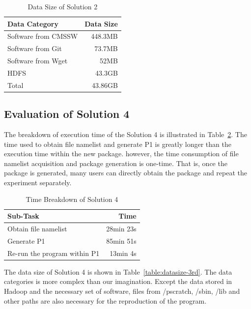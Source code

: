 \documentclass{acm_proc_article-sp}
\begin{document}
\begin{table}
    \centering
    \begin{tabular}{|l|r|}
    \hline
    Data Category & Data Size \\ \hline
    Software from CMSSW & 448.3MB \\ \hline
    Software from Git & 73.7MB \\ \hline
    Software from Wget & 52MB \\ \hline
    HDFS & 43.3GB \\ \hline
    Total & 43.86GB \\ \hline
    \end{tabular}
    \caption{Data Size of Solution 2}
    \label{table:datasize-2nd}
\end{table}

\subsection{Evaluation of Solution 4}
The breakdown of execution time of the Solution 4 is illustrated in Table~\ref{table:time-3rd}. The time used to obtain file namelist and generate P1 is greatly longer than the execution time within the new package. however, the time consumption of file namelist acquisition and package generation is one-time. That is, once the package is generated, many users can directly obtain the package and repeat the experiment separately. 

\begin{table}
    \centering
    \begin{tabular}{|l|r|}
    \hline
    Sub-Task & Time \\ \hline
    Obtain file namelist & 28min 23s \\ \hline
    Generate P1 & 85min 51s \\ \hline
    Re-run the program within P1 & 13min 4s \\ \hline
    \end{tabular}
    \caption{Time Breakdown of Solution 4}
    \label{table:time-3rd}
\end{table}

The data size of Solution 4 is shown in Table~\ref{table:datasize-3rd}. The
data categories is more complex than our imagination. Except the data stored in
Hadoop and the necessary set of software, files from /pscratch, /sbin, /lib and other
paths are also necessary for the reproduction of the program.
\end{document}
